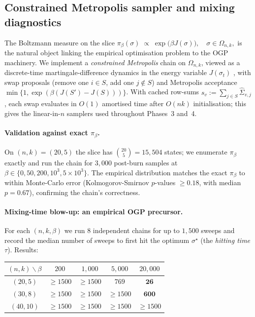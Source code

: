 \subsection{Constrained Metropolis sampler and mixing diagnostics}\label{ssec:p2b}

The Boltzmann measure on the slice
\(
  \pi_\beta(\sigma) \;\propto\; \exp\bigl(\beta J(\sigma)\bigr),\quad \sigma\in\Omega_{n,k},
\)
is the natural object linking the empirical optimisation problem to the OGP machinery. We
implement a \emph{constrained Metropolis} chain on $\Omega_{n,k}$, viewed as a discrete-time
martingale-difference dynamics in the energy variable $J(\sigma_t)$ \cite{vershynin}, with swap proposals
(remove one $i\in S$, add one $j\notin S$) and Metropolis acceptance
$\min\{1,\exp(\beta(J(S')-J(S)))\}$. With cached row-sums
$s_v := \sum_{j\in S}\hat\Sigma_{v,j}$, each swap evaluates in $O(1)$ amortised time
after $O(nk)$ initialisation; this gives the linear-in-$n$ samplers used throughout
Phases~3 and~4.

\paragraph{Validation against exact $\pi_\beta$.} On $(n,k)=(20,5)$ the slice has
$\binom{20}{5}=15{,}504$ states; we enumerate $\pi_\beta$ exactly and run the chain for
$3{,}000$ post-burn samples at $\beta\in\{0,50,200,10^3,5\!\times\!10^3\}$. The empirical
distribution matches the exact $\pi_\beta$ to within Monte-Carlo error (Kolmogorov-Smirnov
$p$-values $\ge 0.18$, with median $p=0.67$), confirming the chain's correctness.

\paragraph{Mixing-time blow-up: an empirical OGP precursor.} For each $(n,k,\beta)$ we run
$8$ independent chains for up to $1{,}500$ sweeps and record the median number of sweeps
to first hit the optimum $\sigma^\star$ (the \emph{hitting time} $\tau$). Results:

\begin{center}\small
\begin{tabular}{c|cccc}
$(n,k)\backslash\beta$ & $200$ & $1{,}000$ & $5{,}000$ & $20{,}000$\\\hline
$(20,5)$ & $\geq 1500$ & $\geq 1500$ & $769$ & $\mathbf{26}$\\
$(30,8)$ & $\geq 1500$ & $\geq 1500$ & $\geq 1500$ & $\mathbf{600}$\\
$(40,10)$ & $\geq 1500$ & $\geq 1500$ & $\geq 1500$ & $\geq 1500$\\
\end{tabular}
\end{center}

